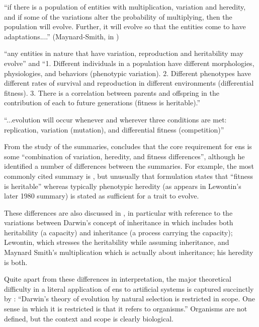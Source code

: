\begin{NOTES}
\begin{compactenum}
\item ``if there is a population of entities with multiplication, variation and heredity, and if some of the variations alter the probability of multiplying, then the population will evolve. Further, it will evolve so that the entities come to have adaptations....'' (Maynard-Smith, in \cite{Griesemer2001})

\item ``any entities in nature that have variation, reproduction and heritability may evolve'' \cite{Lewontin:1970mc} and ``1. Different individuals in a population have different morphologies, physiologies, and behaviors (phenotypic variation). 2. Different phenotypes have different rates of survival and reproduction in different environments (differential fitness). 3. There is a correlation between parents and offspring in the contribution of each to future generations (fitness is heritable).'' \cite{Lewontin:1970mc}

\item ``...evolution will occur whenever and wherever three conditions are met: replication, variation (mutation), and differential fitness (competition)'' \parencite[quoting Daniel Dennett]{Ofria2004}

\end{compactenum}

From the study of the summaries, \cite{Godfrey-Smith2007} concludes that the core requirement for \gls{ens} is some ``combination of variation, heredity, and fitness differences'', although he identified a number of differences between the summaries. For example, the most commonly cited summary is \cite{Lewontin:1970mc}, but unusually that formulation states that ``fitness is heritable'' whereas typically phenotypic heredity (as appears in Lewontin's later 1980 summary) is stated as sufficient for a trait to evolve. 

These differences are also discussed in \parencite{Griesemer2001}, in particular with reference to the variations between Darwin's concept of inheritance in \cite{Darwin1859} which includes both heritability (a capacity) and inheritance (a process carrying the capacity); Lewontin, which stresses the heritability while assuming inheritance, and Maynard Smith's multiplication which is actually about inheritance; his heredity is both. \parencite{Griesemer2001}

Quite apart from these differences in interpretation, the major theoretical difficulty in a literal application of \gls{ens} to artificial systems is captured succinctly by \parencite{Griesemer2005}: ``Darwin's theory of evolution by natural selection is restricted in scope. One sense in which it is restricted is that it refers to organisms.'' Organisms are not defined, but the context and scope is clearly biological.


\end{NOTES}
